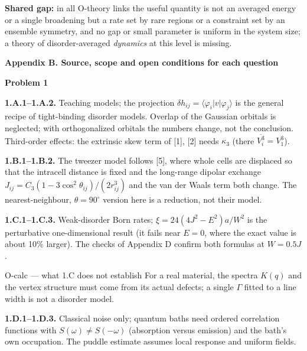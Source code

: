 \documentclass[11pt,a4paper]{article}
\newcommand{\avg}[1]{\overline{#1}}
\newcommand{\pagetitle}[1]{{\large\bfseries\color{ink}#1}\par\vspace{4pt}}
\newcommand{\smallheading}[1]{\par\Needspace{6\baselineskip}\medskip\textbf{#1}\par}
\begin{document}
\textbf{Shared gap:} in all O-theory links the useful quantity is not an averaged energy or a single broadening but a rate set by rare regions or a constraint set by an ensemble symmetry, and no gap or small parameter is uniform in the system size; a theory of disorder-averaged \emph{dynamics} at this level is missing.

\pagetitle{Appendix B. Source, scope and open conditions for each question}
\smallheading{Problem 1}
\textbf{1.A.1--1.A.2.} Teaching models; the projection $\delta h_{ij}=\langle\varphi_i|v|\varphi_j\rangle$ is the general recipe of tight-binding disorder models. Overlap of the Gaussian orbitals is neglected; with orthogonalized orbitals the numbers change, not the conclusion. Third-order effects: the extrinsic skew term of [1], [2] needs $\kappa_3$ (there $\avg{V_i^3}=V_1^3$).

\textbf{1.B.1--1.B.2.} The tweezer model follows [5], where whole cells are displaced so that the intracell distance is fixed and the long-range dipolar exchange $J_{ij}=C_3(1-3\cos^2\theta_{ij})/(2r_{ij}^3)$ and the van der Waals term both change. The nearest-neighbour, $\theta=90^\circ$ version here is a reduction, not their model.

\textbf{1.C.1--1.C.3.} Weak-disorder Born rates; $\xi=24(4J^2-E^2)a/W^2$ is the perturbative one-dimensional result (it fails near $E=0$, where the exact value is about 10\% larger). The checks of Appendix D confirm both formulas at $W=0.5J$.
\begin{redbox}{O-calc --- what 1.C does not establish}
For a real material, the spectra $K(q)$ and the vertex structure must come from its actual defects; a single $\Gamma$ fitted to a line width is not a disorder model.
\end{redbox}
\textbf{1.D.1--1.D.3.} Classical noise only; quantum baths need ordered correlation functions with $S(\omega)\neq S(-\omega)$ (absorption versus emission) and the bath's own occupation. The puddle estimate assumes local response and uniform fields.
\end{document}
